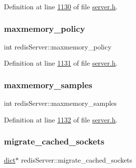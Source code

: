 Definition at line \hyperlink{server_8h_source_l01130}{1130} of file \hyperlink{server_8h_source}{server.\+h}.

\mbox{\label{structredisServer_ac165e497fd2d6b3881f4cbab86889d58}} 
\subsubsection{\texorpdfstring{maxmemory\+\_\+policy}{maxmemory\_policy}}
{\footnotesize\ttfamily int redis\+Server\+::maxmemory\+\_\+policy}



Definition at line \hyperlink{server_8h_source_l01131}{1131} of file \hyperlink{server_8h_source}{server.\+h}.

\mbox{\label{structredisServer_a239ef47478e345cb6323b1a35a9e4753}} 
\subsubsection{\texorpdfstring{maxmemory\+\_\+samples}{maxmemory\_samples}}
{\footnotesize\ttfamily int redis\+Server\+::maxmemory\+\_\+samples}



Definition at line \hyperlink{server_8h_source_l01132}{1132} of file \hyperlink{server_8h_source}{server.\+h}.

\mbox{\label{structredisServer_a73bc44b9c6dc081f057ead6d79890a11}} 
\subsubsection{\texorpdfstring{migrate\+\_\+cached\+\_\+sockets}{migrate\_cached\_sockets}}
{\footnotesize\ttfamily \hyperlink{structdict}{dict}$\ast$ redis\+Server\+::migrate\+\_\+cached\+\_\+sockets}



